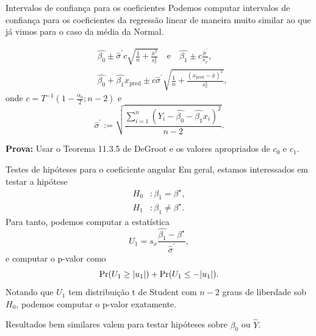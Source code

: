 \begin{frame}{Intervalos de confiança para os coeficientes}
Podemos computar intervalos de confiança para os coeficientes da regressão linear de maneira muito similar ao que já vimos para o caso da média da Normal.

\begin{theo}
\begin{align*}
 &\hat{\beta_0} \pm \hat{\sigma}^\prime c\sqrt{\frac{1}{n} + \frac{\bar{x}^2}{s_x^2}}\quad \text{e}\quad \hat{\beta_1} \pm c\frac{\hat{\sigma}^\prime}{s_x},\\
 &\hat{\beta_0} + \hat{\beta_1}x_{\text{pred}} \pm c \hat{\sigma}^\prime \sqrt{\frac{1}{n} + \frac{\left(x_{\text{pred}}-\bar{x}\right)^2}{s_x^2} },
\end{align*}
onde $c = T^{-1}(1-\frac{\alpha_0}{2}; n-2)$ e 
\begin{equation*}
 \hat{\sigma}^\prime := \sqrt{\frac{\sum_{i=1}^n \left(Y_i - \hat{\beta_0} - \hat{\beta_1}x_i \right)^2}{n-2}}.
\end{equation*}
\end{theo}
\textbf{Prova:} Usar o Teorema 11.3.5 de DeGroot e os valores apropriados de $c_0$ e $c_1$.
\end{frame}

\begin{frame}{Testes de hipóteses para o coeficiente angular}
Em geral, estamos interessados em testar a hipótese
\begin{align*}
 H_0 &: \beta_1 = \beta^\star,\\
 H_1 &: \beta_1 \neq \beta^\star.
\end{align*}
Para tanto, podemos computar a estatística
\begin{equation*}
 U_1 = s_x \frac{\hat{\beta_1}-\beta^\star}{\hat{\sigma}^\prime},
\end{equation*}
e computar o p-valor como 
\begin{equation*}
 \operatorname{Pr}(U_1 \geq |u_1|) + \operatorname{Pr}(U_1 \leq -|u_1|).
\end{equation*}
Notando que $U_1$ tem distribuição t de Student com $n-2$ graus de liberdade sob $H_0$, podemos computar o p-valor exatamente.

Resultados bem similares valem para testar hipóteses sobre $\beta_0$ ou $\hat{Y}$.
\end{frame}

